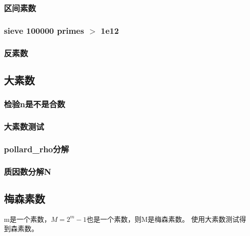 \documentclass[a4paper]{article}
\begin{document}
\begin{CJK*}{UTF8}{gbsn}
\begin{multicols}{3}
\begin{flushleft}
\subsubsection{区间素数}


\subsubsection{sieve 100000 primes $>$ 1e12}


\subsubsection{反素数}




\subsection{大素数}




\subsubsection{检验n是不是合数}




\subsubsection{大素数测试}


\subsubsection{pollard\_rho分解}



\subsubsection{质因数分解N }


\subsection{梅森素数}
m是一个素数，$M=2^m-1$也是一个素数，则M是梅森素数。
使用大素数测试得到森素数。


\end{flushleft}
\end{multicols}
\end{CJK*}
\end{document}
